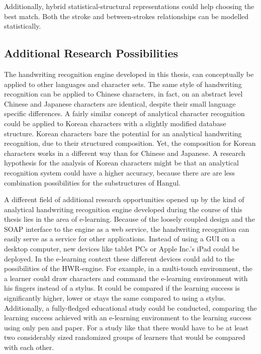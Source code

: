 Additionally, hybrid statistical-structural representations could help choosing
the best match. Both the stroke and between-strokes relationships can be
modelled statistically.


\subsection{Additional Research Possibilities}
\label{sec:conclusion:newresearchpossibilities}
The handwriting recognition engine developed in this thesis, can conceptually
be applied to other languages and character sets.
The same style of handwriting recognition can be applied to Chinese characters, 
in fact, on an abstract level Chinese and Japanese characters are identical,
despite their small language specific differences.
A fairly similar concept of analytical character recognition could be applied 
to Korean characters with a slightly modified database structure.
Korean characters bare the potential for an analytical handwriting recognition,
due to their structured composition. Yet, the composition for Korean characters
works in a different way than for Chinese and Japanese. A research hypothesis
for the analysis of Korean characters might be that an analytical recognition
system could have a higher accuracy, because there are are less combination 
possibilities for the substructures of Hangul.

A different field of additional research opportunities opened up by the
kind of analytical handwriting recognition engine developed during the
course of this thesis lies in the area of e-learning.
Because of the loosely coupled design and the SOAP interface to the engine
as a web service, the handwriting recognition can easily serve as a service 
for other applications. 
Instead of using a GUI on a desktop computer, new devices like tablet PCs or 
Apple Inc.'s iPad could be deployed.
In the e-learning context these different devices could add to the possibilities
of the HWR-engine.
For example, in a multi-touch environment, the a learner could draw characters 
and command the e-learning environment with his fingers instead of a stylus.
It could be compared if the learning success is significantly higher, lower or
stays the same compared to using a stylus.
Additionally, a fully-fledged educational study could be conducted, 
comparing the learning success achieved with an e-learning environment to the 
learning success using only pen and paper.
For a study like that there would have to be at least two considerably sized 
randomized groups of learners that would be compared with each other.

